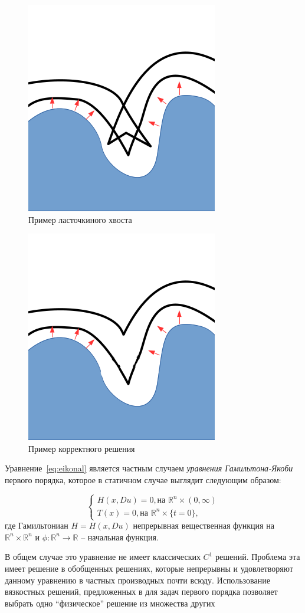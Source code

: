\begin{figure}[h]
  \centering
  \includegraphics[width=0.3\linewidth]{img/swallow-tail-example.png}
  \hfil \caption{Пример ласточкиного хвоста}
  \label{fig:swallow-ex}

\end{figure}

\begin{figure}[h]
  \centering
  \includegraphics[width=0.3\linewidth]{img/corrct-example.png}
  \hfil \caption{Пример корректного решения}
  \label{fig:correct-exmp}

\end{figure}

Уравнение~\eqref{eq:eikonal} является частным случаем \textit{уравнения
Гамильтона-Якоби} первого порядка, которое в статичном случае выглядит
следующим образом:

\begin{equation}
  \label{eq:hje}
  \left\{ \begin{matrix}
      H(x, Du) = 0,\text{на } \mathbb{R}^n \times (0,\infty) \\
      T(x) = 0,  \text{на } \mathbb{R}^n \times \{t = 0\},
    \end{matrix}\right.
\end{equation}
где Гамильтониан $H = H(x,Du)$ непрерывная вещественная функция на
$\mathbb{R}^n \times \mathbb{R}^n$ и $\phi : \mathbb{R}^n \rightarrow
\mathbb{R}$ -- начальная функция.

В общем случае это уравнение не имеет классических $C^1$
решений. Проблема эта имеет решение в обобщенных решениях, которые
непрерывны и удовлетворяют данному уравнению в частных производных
почти всюду. Использование вязкостных  решений, предложенных в
\cite{V1984,V1983} для задач первого порядка позволяет выбрать одно
``физическое'' решение из множества других

